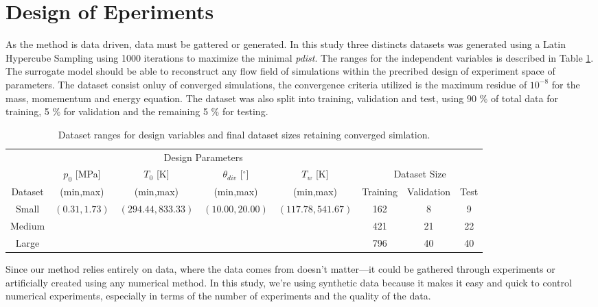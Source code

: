 \section{Design of Eperiments}

As the method is data driven, data must be gattered or generated. In this study three distincts datasets was generated using a Latin Hypercube Sampling using 1000 iterations to maximize the minimal \textit{pdist}. The ranges for the independent variables is described in Table \ref{tab:doe_lhs}. The surrogate model should be able to reconstruct any flow field of simulations within the precribed design of experiment space of parameters. The dataset consist onluy of converged simulations, the convergence criteria utilized is the maximum residue of $10^{-8}$ for the mass, momementum and energy equation. The dataset was also split into training, validation and test, using $90$ \% of total data for training, 5 \% for validation and the remaining 5 \% for testing.



\begin{table}[h!]
  \centering
  \begin{tabular}{c c c c c c c c} 
   \hline
            & \multicolumn{4}{c}{Design Parameters}  &  \multicolumn{3}{c}{} \\
            & $p_0$ [MPa] & $T_0$ [K] & $\theta_{div}$ [$^\circ$] & $T_w$ [K] & \multicolumn{3}{c}{Dataset Size} \\
    Dataset & (min,max) & (min,max) & (min,max) & (min,max) & Training & Validation & Test \\
   \hline\hline
   Small & \multirow{3}{*}{$(0.31, 1.73)$} & \multirow{3}{*}{$(294.44, 833.33)$} & \multirow{3}{*}{$(10.00, 20.00)$} & \multirow{3}{*}{$(117.78, 541.67)$} & 162 & 8 & 9 \\ 
   Medium &  &  & & & 421 & 21 &  22\\
   Large &  &  & & & 796 & 40 &  40\\
   \hline
  \end{tabular}
  \caption{Dataset ranges for design variables and final dataset sizes retaining converged simlation.}
  \label{tab:doe_lhs}
\end{table}


Since our method relies entirely on data, where the data comes from doesn't matter—it could be gathered through experiments or artificially created using any numerical method. In this study, we're using synthetic data because it makes it easy and quick to control numerical experiments, especially in terms of the number of experiments and the quality of the data.

